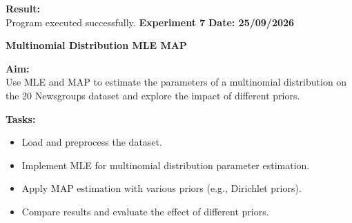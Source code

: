 \documentclass[12pt, a4paper]{article}
\begin{document}
\vspace{\baselineskip}

\noindent \textbf{Result:}\\
Program executed successfully.
\newpage
\noindent \textbf{Experiment 7} \hfill \textbf{Date: 25/09/2026}\\
\begin{center} \Large \textbf{Multinomial Distribution MLE MAP} \end{center}
\textbf{Aim:}\\
Use MLE and MAP to estimate the parameters of a multinomial distribution on the 20 Newsgroups dataset and explore the impact of different priors.

\vspace{\baselineskip}
\noindent \textbf{Tasks:}\\
\vspace{-0.5\baselineskip}
\begin{itemize}[nosep]
    \item Load and preprocess the dataset.
    \item Implement MLE for multinomial distribution parameter estimation.
    \item Apply MAP estimation with various priors (e.g., Dirichlet priors).
    \item Compare results and evaluate the effect of different priors.
\end{itemize}
\end{document}
